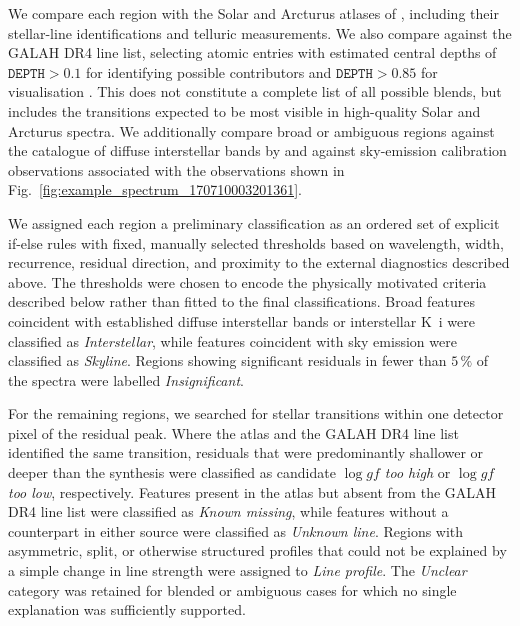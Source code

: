 \documentclass[twocolumn,apj,numberedappendix,appendixfloats]{openjournal}
\begin{document}
We compare each region with the Solar and Arcturus atlases of \citet{Hinkle2000}, including their stellar-line identifications and telluric measurements. We also compare against the GALAH DR4 line list, selecting atomic entries with estimated central depths of $\texttt{DEPTH}>0.1$ for identifying possible contributors and $\texttt{DEPTH}>0.85$ for visualisation \citep[see also Sec.~4.2 of][]{Heiter2021}. This does not constitute a complete list of all possible blends, but includes the transitions expected to be most visible in high-quality Solar and Arcturus spectra. We additionally compare broad or ambiguous regions against the catalogue of diffuse interstellar bands by \citet{Vogrincic2023} and against sky-emission calibration observations associated with the observations shown in Fig.~\ref{fig:example_spectrum_170710003201361}.

\begin{table}
\caption{Example entries from the significant-residual catalogue, including residual signifance $s_\lambda$ (see Eq.~\ref{eq:def_significance}) and sky flux $f_\mathrm{sky}$, selected to illustrate the nine classifications shown in Fig.~\ref{fig:example_significant_residual_regions}. The complete machine-readable catalogue is available in the public repository.}
\label{tab:tabular_peak_information}

\end{table}

We assigned each region a preliminary classification as an ordered set of explicit if-else rules with fixed, manually selected thresholds based on wavelength, width, recurrence, residual direction, and proximity to the external diagnostics described above. The thresholds were chosen to encode the physically motivated criteria described below rather than fitted to the final classifications. Broad features coincident with established diffuse interstellar bands or interstellar K~{\sc i} were classified as \textit{Interstellar}, while features coincident with sky emission were classified as \textit{Skyline}. Regions showing significant residuals in fewer than $5\,\mathrm{\%}$ of the spectra were labelled \textit{Insignificant}.

For the remaining regions, we searched for stellar transitions within one detector pixel of the residual peak. Where the \citet{Hinkle2000} atlas and the GALAH DR4 line list identified the same transition, residuals that were predominantly shallower or deeper than the synthesis were classified as candidate \textit{$\log gf$ too high} or \textit{$\log gf$ too low}, respectively. Features present in the atlas but absent from the GALAH DR4 line list were classified as \textit{Known missing}, while features without a counterpart in either source were classified as \textit{Unknown line}. Regions with asymmetric, split, or otherwise structured profiles that could not be explained by a simple change in line strength were assigned to \textit{Line profile}. The \textit{Unclear} category was retained for blended or ambiguous cases for which no single explanation was sufficiently supported.
\end{document}
